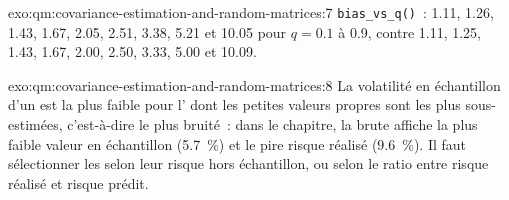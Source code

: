 \begin{solution}{exo:qm:covariance-estimation-and-random-matrices:7}
\texttt{bias\_vs\_q()}~: 1.11, 1.26, 1.43, 1.67, 2.05, 2.51, 3.38, 5.21 et 10.05 pour $q = 0.1$ à 0.9, contre 1.11, 1.25, 1.43, 1.67, 2.00, 2.50, 3.33, 5.00 et 10.09.
\end{solution}

\begin{solution}{exo:qm:covariance-estimation-and-random-matrices:8}
La volatilité en échantillon d'un  est la plus faible pour l' dont les petites valeurs propres sont les plus sous-estimées, c'est-à-dire le plus bruité~: dans le chapitre, la
 brute affiche la plus faible valeur en échantillon (5.7~\%) et le pire risque réalisé (9.6~\%). Il faut sélectionner les  selon leur risque hors échantillon, ou selon le ratio entre risque réalisé et risque prédit.
\end{solution}

